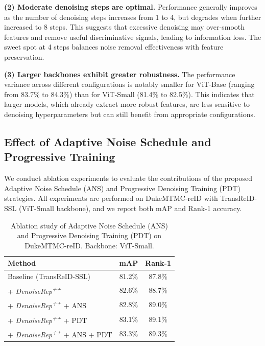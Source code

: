 \documentclass[conference]{IEEEtran}
\begin{document}
{{\textbf{(2) Moderate denoising steps are optimal.} Performance generally improves as the number of denoising steps increases from 1 to 4, but degrades when further increased to 8 steps. This suggests that excessive denoising may over-smooth features and remove useful discriminative signals, leading to information loss. The sweet spot at 4 steps balances noise removal effectiveness with feature preservation.

\textbf{(3) Larger backbones exhibit greater robustness.} The performance variance across different configurations is notably smaller for ViT-Base (ranging from 83.7\% to 84.3\%) than for ViT-Small (81.4\% to 82.5\%). This indicates that larger models, which already extract more robust features, are less sensitive to denoising hyperparameters but can still benefit from appropriate configurations.


\subsection{Effect of Adaptive Noise Schedule and Progressive Training}
\label{sec:exp_adaptive_progressive}

We conduct ablation experiments to evaluate the contributions of the proposed Adaptive Noise Schedule (ANS) and Progressive Denoising Training (PDT) strategies. All experiments are performed on DukeMTMC-reID with TransReID-SSL (ViT-Small backbone), and we report both mAP and Rank-1 accuracy.

\begin{table}[t]
\centering
\caption{Ablation study of Adaptive Noise Schedule (ANS) and Progressive Denoising Training (PDT) on DukeMTMC-reID. Backbone: ViT-Small.}
\label{tab:ablation_ans_pdt}
\vspace{0.2cm}
\renewcommand{\arraystretch}{1.2}
\begin{tabular}{l|cc}
\hline \hline
\textbf{Method} & \textbf{mAP} & \textbf{Rank-1} \\
\hline
Baseline (TransReID-SSL) & 81.2\% & 87.8\% \\
+ \textit{DenoiseRep\textsuperscript{++}} & 82.6\% & 88.7\% \\
\hline
+ \textit{DenoiseRep\textsuperscript{++}} + ANS & 82.8\% & 89.0\% \\
+ \textit{DenoiseRep\textsuperscript{++}} + PDT & 83.1\% & 89.1\% \\
+ \textit{DenoiseRep\textsuperscript{++}} + ANS + PDT & 83.3\% & 89.3\% \\
\hline \hline
\end{tabular}
\end{table}

}}
\end{document}
